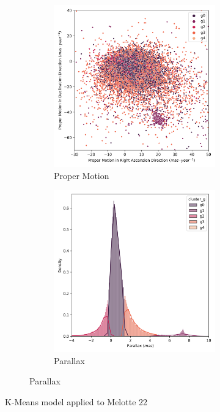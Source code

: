 \documentclass[11pt, a4paper, english]{book}
\begin{document}
\begin{figure}[htbp]
  \centering
  \begin{subfigure}{0.9\textwidth}
    \centering
    \begin{subfigure}[t]{.45\textwidth}
      \centering
      \includegraphics[width=\textwidth]{../figures/melotte_22/kmeans_pm_melotte_22.png}
      \caption{Proper Motion}
    \end{subfigure}
    \hfill
    \begin{subfigure}[t]{.45\textwidth}
      \centering
      \includegraphics[width=\textwidth]{../figures/melotte_22/kmeans_parallax_melotte_22.png}
      \caption{Parallax}
    \end{subfigure}
  \end{subfigure}
  \caption{K-Means model applied to Melotte 22}
  \label{fig:kmeans_melotte_22}
\end{figure}
\end{document}
